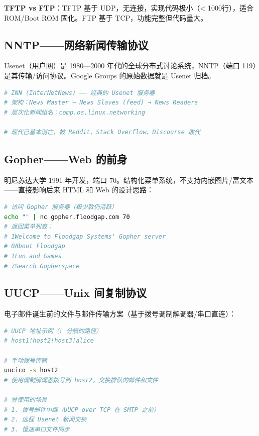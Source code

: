 \documentclass[12pt,UTF8]{ctexbook}
\begin{document}
\textbf{TFTP vs FTP}：TFTP 基于 UDP，无连接，实现代码极小（< 1000行），适合 ROM/Boot ROM 固化。FTP 基于 TCP，功能完整但代码量大。

\subsection{NNTP——网络新闻传输协议}

Usenet（用户网）是 1980—2000 年代的全球分布式讨论系统，NNTP（端口 119）是其传输/访问协议。Google Groups 的原始数据就是 Usenet 归档。

\begin{lstlisting}[language=bash]
# INN (InterNetNews) —— 经典的 Usenet 服务器
# 架构：News Master → News Slaves (feed) → News Readers
# 层次化新闻组名：comp.os.linux.networking

# 现代已基本消亡，被 Reddit、Stack Overflow、Discourse 取代
\end{lstlisting}

\subsection{Gopher——Web 的前身}

明尼苏达大学 1991 年开发，端口 70。结构化菜单系统，不支持内嵌图片/富文本——直接影响后来 HTML 和 Web 的设计思路：

\begin{lstlisting}[language=bash]
# 访问 Gopher 服务器（极少数仍活跃）
echo "" | nc gopher.floodgap.com 70
# 返回菜单列表：
# 1Welcome to Floodgap Systems' Gopher server
# 0About Floodgap
# 1Fun and Games
# 7Search Gopherspace
\end{lstlisting}

\subsection{UUCP——Unix 间复制协议}

电子邮件诞生前的文件与邮件传输方案（基于拨号调制解调器/串口直连）：

\begin{lstlisting}[language=bash]
# UUCP 地址示例（! 分隔的路径）
# host1!host2!host3!alice

# 手动拨号传输
uucico -s host2
# 使用调制解调器拨号到 host2，交换排队的邮件和文件

# 曾使用的场景
# 1. 拨号邮件中继（UUCP over TCP 在 SMTP 之前）
# 2. 远程 Usenet 新闻交换
# 3. 慢速串口文件同步
\end{lstlisting}
\end{document}
